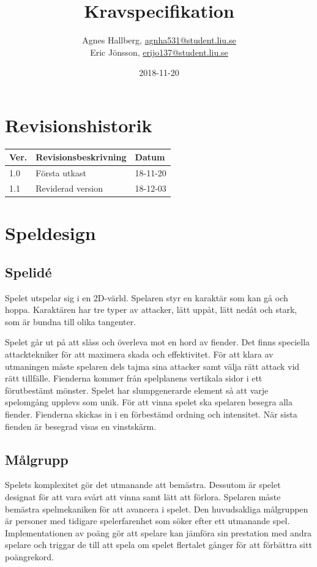 \documentclass{TDP005mall}
\author{Agnes Hallberg, \url{agnha531@student.liu.se}\\
  Eric Jönsson, \url{erijo137@student.liu.se}}
\title{Kravspecifikation}
\date{2018-11-20}
\begin{document}
\projectpage

\section*{Revisionshistorik}
\begin{table}[!h]
\begin{tabularx}{\linewidth}{|l|X|l|}
\hline
Ver. & Revisionsbeskrivning & Datum \\\hline
1.0 & Första utkast  & 18-11-20 \\\hline
1.1 & Reviderad version  & 18-12-03 \\\hline
\end{tabularx}
\end{table}

\section{Speldesign}

\subsection{Spelidé}
Spelet utspelar sig i en 2D-värld. Spelaren styr en karaktär som kan gå och hoppa. Karaktären har tre typer av attacker, lätt uppåt, lätt nedåt och stark, som är bundna till olika tangenter.  

Spelet går ut på att slåss och överleva mot en hord av fiender. 
Det finns speciella attacktekniker för att maximera skada och effektivitet. 
För att klara av utmaningen måste spelaren dels tajma sina attacker samt välja rätt attack vid rätt tillfälle. 
Fienderna kommer från spelplanens vertikala sidor i ett förutbestämt mönster. 
Spelet har slumpgenerarde element så att varje spelomgång upplevs som unik.
För att vinna spelet ska spelaren besegra alla fiender. 
Fienderna skickas in i en förbestämd ordning och intensitet. 
När sista fienden är besegrad visas en vinstskärm.

\subsection{Målgrupp}
Spelets komplexitet gör det utmanande att bemästra. 
Dessutom är spelet designat för att vara svårt att vinna samt lätt att förlora. 
Spelaren måste bemästra spelmekaniken för att avancera i spelet. 
Den huvudsakliga målgruppen är personer med tidigare spelerfarenhet som söker efter ett utmanande spel. 
Implementationen av poäng gör att spelare kan jämföra sin prestation med andra spelare och triggar de till att spela om spelet flertalet gånger för att förbättra sitt poängrekord.
\end{document}
